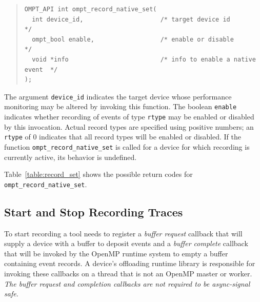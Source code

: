 \documentclass{article}
\begin{document}
\begin{quote}
\begin{verbatim}
OMPT_API int ompt_record_native_set(
  int device_id,                     /* target device id                */
  ompt_bool enable,                  /* enable or disable               */
  void *info                         /* info to enable a native  event  */
);
\end{verbatim}
\end{quote}
The argument \verb|device_id| indicates the target device whose performance monitoring may be altered by invoking this function. The boolean \verb|enable| indicates whether recording of events of type \verb|rtype| may be enabled or disabled by this invocation.
Actual record types are specified using positive numbers; an \verb|rtype| of  0 indicates that all record types will be enabled or disabled. If the function \verb|ompt_record_native_set| is called for a device for which recording is currently active, its behavior is undefined.

Table~\ref{table:record_set} shows the possible return codes for \verb|ompt_record_native_set|.

\subsection{Start and Stop Recording Traces}
\label{sec:start-stop-recording}

To start recording a tool needs to register a \emph{buffer request} callback that will supply a device with a buffer to deposit events and a \emph{buffer complete} callback that will be invoked by the OpenMP runtime system to empty a buffer containing event records. A device's offloading runtime library is responsible for invoking these callbacks on a thread that is not an OpenMP master or worker. {\em The buffer request and completion callbacks are not required to  be async-signal safe.}
\end{document}
